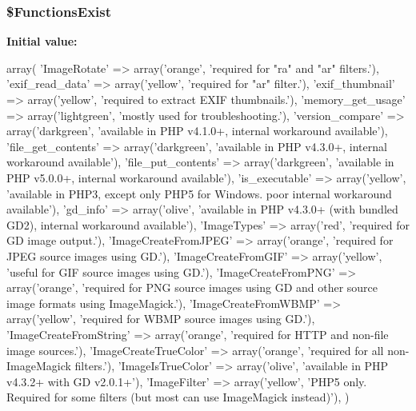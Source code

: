 \hypertarget{php_thumb_8demo_8check_8php_ab54d96bbc12fd7896af863677487eb01}{
\subsubsection[{\$\-Functions\-Exist}]{\setlength{\rightskip}{0pt plus 5cm}\$\-Functions\-Exist}}\label{php_thumb_8demo_8check_8php_ab54d96bbc12fd7896af863677487eb01}
{\bfseries \-Initial value\-:}
\begin{DoxyCode}
 array(
        'ImageRotate'           => array('orange',     'required for "ra" and
       "ar" filters.'),
        'exif_read_data'        => array('yellow',     'required for "ar"
       filter.'),
        'exif_thumbnail'        => array('yellow',     'required to extract
       EXIF thumbnails.'),
        'memory_get_usage'      => array('lightgreen', 'mostly used for
       troubleshooting.'),
        'version_compare'       => array('darkgreen',  'available in PHP
       v4.1.0+, internal workaround available'),
        'file_get_contents'     => array('darkgreen',  'available in PHP
       v4.3.0+, internal workaround available'),
        'file_put_contents'     => array('darkgreen',  'available in PHP
       v5.0.0+, internal workaround available'),
        'is_executable'         => array('yellow',     'available in PHP3,
       except only PHP5 for Windows. poor internal workaround available'),
        'gd_info'               => array('olive',      'available in PHP
       v4.3.0+ (with bundled GD2), internal workaround available'),
        'ImageTypes'            => array('red',        'required for GD image
       output.'),
        'ImageCreateFromJPEG'   => array('orange',     'required for JPEG
       source images using GD.'),
        'ImageCreateFromGIF'    => array('yellow',     'useful for GIF source
       images using GD.'),
        'ImageCreateFromPNG'    => array('orange',     'required for PNG source
       images using GD and other source image formats using ImageMagick.'),
        'ImageCreateFromWBMP'   => array('yellow',     'required for WBMP
       source images using GD.'),
        'ImageCreateFromString' => array('orange',     'required for HTTP and
       non-file image sources.'),
        'ImageCreateTrueColor'  => array('orange',     'required for all
       non-ImageMagick filters.'),
        'ImageIsTrueColor'      => array('olive',      'available in PHP
       v4.3.2+ with GD v2.0.1+'),
        'ImageFilter'           => array('yellow',     'PHP5 only. Required for
       some filters (but most can use ImageMagick instead)'),
)
\end{DoxyCode}


